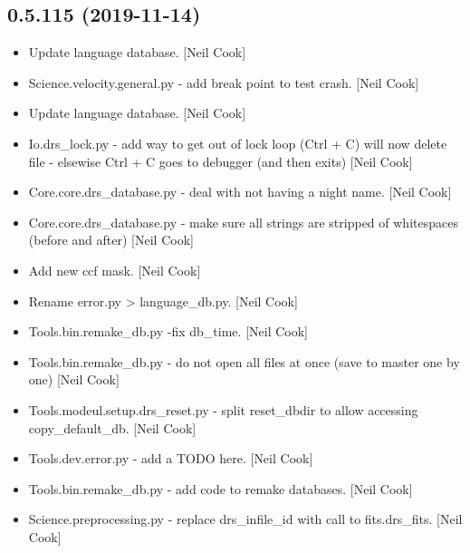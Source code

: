 \documentclass[a4paper,10pt,english]{report}
\begin{document}
\subsection{0.5.115 (2019-11-14)}
\label{\detokenize{misc/changelog:id26}}\begin{itemize}
\item {} 
Update language database. {[}Neil Cook{]}

\item {} 
Science.velocity.general.py - add break point to test crash. {[}Neil
Cook{]}

\item {} 
Update language database. {[}Neil Cook{]}

\item {} 
Io.drs\_lock.py - add way to get out of lock loop (Ctrl + C) will now
delete file - elsewise Ctrl + C goes to debugger (and then exits)
{[}Neil Cook{]}

\item {} 
Core.core.drs\_database.py - deal with not having a night name. {[}Neil
Cook{]}

\item {} 
Core.core.drs\_database.py - make sure all strings are stripped of
whitespaces (before and after) {[}Neil Cook{]}

\item {} 
Add new ccf mask. {[}Neil Cook{]}

\item {} 
Rename error.py \textendash{}\textgreater{} language\_db.py. {[}Neil Cook{]}

\item {} 
Tools.bin.remake\_db.py -fix db\_time. {[}Neil Cook{]}

\item {} 
Tools.bin.remake\_db.py - do not open all files at once (save to master
one by one) {[}Neil Cook{]}

\item {} 
Tools.modeul.setup.drs\_reset.py - split reset\_dbdir to allow accessing
copy\_default\_db. {[}Neil Cook{]}

\item {} 
Tools.dev.error.py - add a TODO here. {[}Neil Cook{]}

\item {} 
Tools.bin.remake\_db.py - add code to remake databases. {[}Neil Cook{]}

\item {} 
Science.preprocessing.py - replace drs\_infile\_id with call to
fits.drs\_fits. {[}Neil Cook{]}


\end{itemize}
\end{document}
